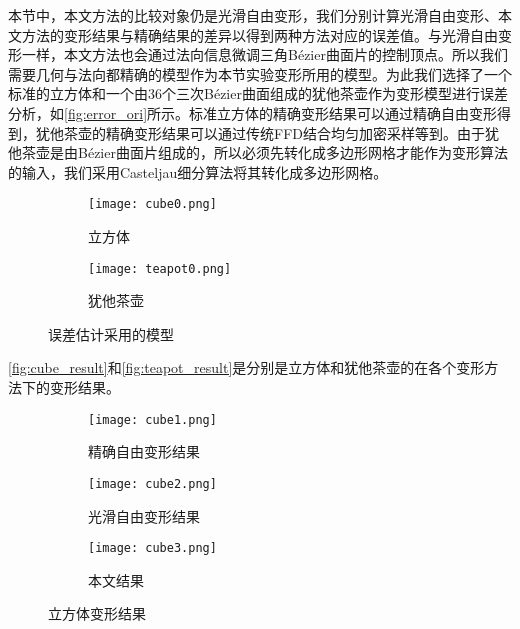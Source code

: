 本节中，本文方法的比较对象仍是光滑自由变形，我们分别计算光滑自由变形、本文方法的变形结果与精确结果的差异以得到两种方法对应的误差值。与光滑自由变形一样，本文方法也会通过法向信息微调三角Bézier曲面片的控制顶点。所以我们需要几何与法向都精确的模型作为本节实验变形所用的模型。为此我们选择了一个标准的立方体和一个由36个三次Bézier曲面组成的犹他茶壶作为变形模型进行误差分析，如\autoref{fig:error_ori}所示。标准立方体的精确变形结果可以通过精确自由变形\cite{Feng00}得到，犹他茶壶的精确变形结果可以通过传统FFD结合均匀加密采样等到。由于犹他茶壶是由Bézier曲面片组成的，所以必须先转化成多边形网格才能作为变形算法的输入，我们采用Casteljau细分算法将其转化成多边形网格。
\begin{figure}[htbp]
	\centering
	\begin{subfigure}[b]{.4\textwidth}
		\centering
		\texttt{[image: cube0.png]}
		\caption{立方体}\label{subfig:cube0}
	\end{subfigure}
	\quad
	\begin{subfigure}[b]{.4\textwidth}
		\centering
		\texttt{[image: teapot0.png]}
		\caption{犹他茶壶}\label{subfig:teapot0}
	\end{subfigure}
	\quad
	\caption{误差估计采用的模型}\label{fig:error_ori}
\end{figure}

\autoref{fig:cube_result}和\autoref{fig:teapot_result}是分别是立方体和犹他茶壶的在各个变形方法下的变形结果。

\begin{figure}[htbp]
	\centering
	\begin{subfigure}[b]{.3\textwidth}
		\centering
		\texttt{[image: cube1.png]}
		\caption{精确自由变形结果}\label{subfig:cube1}
	\end{subfigure}
	\begin{subfigure}[b]{.3\textwidth}
		\centering
		\texttt{[image: cube2.png]}
		\caption{光滑自由变形结果}\label{subfig:cube2}
	\end{subfigure}
	\begin{subfigure}[b]{.3\textwidth}
		\centering
		\texttt{[image: cube3.png]}
		\caption{本文结果}\label{subfig:cube3}
	\end{subfigure}
	\caption{立方体变形结果}\label{fig:cube_result}
\end{figure}

